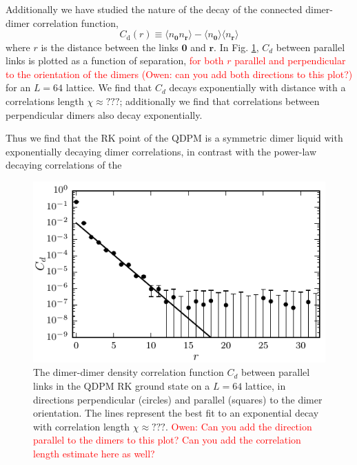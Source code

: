 \documentclass[twocolumn,prb,aps,floatfix,superscriptaddress]{revtex4-1}
\newcommand{\figref}[1]{Fig. \ref{#1}}
\newcommand{\note}[1]{\textcolor{red}{#1}}
\begin{document}
Additionally we have studied the nature of the decay of the connected dimer-dimer correlation function,
  \begin{equation}
    C_{\mathrm{d}} \left(r\right) \equiv \langle n_{\bm{0}} n_{\bm{r}} \rangle - \langle n_{\bm{0}} \rangle   \langle n_{\bm{r}} \rangle   
\end{equation}
where $r$ is the distance between the links $\bm{0}$ and $\bm{r}$. In \figref{fig:spatial_dmr_cor}, $C_d$ between parallel links is plotted as a function of separation, \textcolor{red}{for both $r$ parallel and perpendicular to the orientation of the dimers} \note{(Owen: can you add both directions to this plot?)} for an $L=64$ lattice. We find that $C_d$ decays exponentially with distance with a correlations length  $\chi\approx???$; additionally we find that correlations between perpendicular dimers also decay exponentially.

Thus we find that the RK point of the QDPM is a symmetric dimer liquid with exponentially decaying dimer correlations, in contrast with the power-law decaying correlations of the 

\begin{figure}
    \centering
    \includegraphics[width=1.0\columnwidth]{spatial_cors_parallel.pdf}
    \caption{The dimer-dimer density correlation function $C_d$ between parallel links in the QDPM RK ground state on a $L=64$ lattice, in directions perpendicular (circles) and parallel (squares) to the dimer orientation.  The lines represent the best fit to an exponential decay with correlation length $\chi\approx???$. \note{Owen: Can you add the direction parallel to the dimers to this plot? Can you add the correlation length estimate here as well?}}
    \label{fig:spatial_dmr_cor}
\end{figure}
\end{document}
